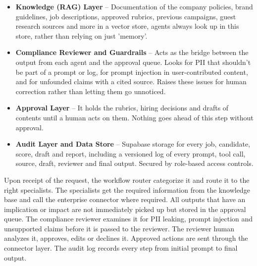\begin{itemize}
  \item \textbf{Knowledge (RAG) Layer} -- Documentation of the company policies, brand guidelines, job descriptions, approved rubrics, previous campaigns, guest research sources and more in a vector store, agents always look up in this store, rather than relying on just 'memory'.
  \item \textbf{Compliance Reviewer and Guardrails} -- Acts as the bridge between the output from each agent and the approval queue. Looks for PII that shouldn't be part of a prompt or log, for prompt injection in user-contributed content, and for unfounded claims with a cited source. Raises these issues for human correction rather than letting them go unnoticed.
  \item \textbf{Approval Layer} -- It holds the rubrics, hiring decisions and drafts of contents until a human acts on them. Nothing goes ahead of this step without approval.
  \item \textbf{Audit Layer and Data Store} -- Supabase storage for every job, candidate, score, draft and report, including a versioned log of every prompt, tool call, source, draft, reviewer and final output. Secured by role-based access controls.
\end{itemize}

\vspace{12pt}
Upon receipt of the request, the workflow router categorize it and route it to the right specialists. The specialists get the required information from the knowledge base and call the enterprise connector where required. All outputs that have an implication or impact are not immediately picked up but stored in the approval queue. The compliance reviewer examines it for PII leaking, prompt injection and unsupported claims before it is passed to the reviewer. The reviewer human analyzes it, approves, edits or declines it. Approved actions are sent through the connector layer. The audit log records every step from initial prompt to final output.